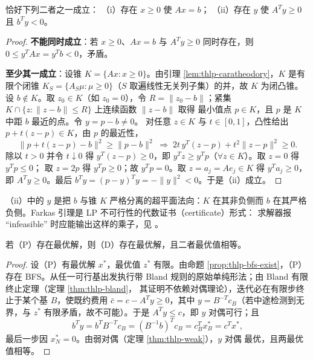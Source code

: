 \begin{lemma}[Farkas]\label{lem:thlp-farkas}
恰好下列二者之一成立：
（i）存在 $x\ge0$ 使 $Ax=b$；
（ii）存在 $y$ 使 $A^{T}y\ge0$ 且 $b^{T}y<0$。
\end{lemma}

\begin{proof}
\textbf{不能同时成立}：若 $x\ge0$、$Ax=b$ 与 $A^{T}y\ge0$ 同时存在，则
$0\le y^{T}Ax=y^{T}b<0$，矛盾。

\textbf{至少其一成立}：设锥 $K=\{Ax:x\ge0\}$。由引理
\ref{lem:thlp-caratheodory}，$K$ 是有限个闭锥
$K_S=\{A_S\mu:\mu\ge0\}$（$S$ 取遍线性无关列子集）的并，故 $K$ 为闭凸锥。
设 $b\notin K$。取 $z_0\in K$（如 $z_0=0$），令
$R=\|z_0-b\|$；紧集 $K\cap\{z:\|z-b\|\le R\}$ 上连续函数 $\|z-b\|$ 取得
最小值点 $p\in K$，且 $p$ 是 $K$ 中距 $b$ 最近的点。令 $y=p-b\ne0$。
对任意 $z\in K$ 与 $t\in[0,1]$，凸性给出 $p+t(z-p)\in K$，由 $p$ 的最近性，
\begin{equation*}
  \|p+t(z-p)-b\|^{2}\ge\|p-b\|^{2}
  \;\Longrightarrow\;
  2t\,y^{T}(z-p)+t^{2}\|z-p\|^{2}\ge0 .
\end{equation*}
除以 $t>0$ 并令 $t\downarrow0$ 得 $y^{T}(z-p)\ge0$，即
$y^{T}z\ge y^{T}p$（$\forall z\in K$）。取 $z=0$ 得 $y^{T}p\le0$；
取 $z=2p$ 得 $y^{T}p\ge0$；故 $y^{T}p=0$。取 $z=a_j=Ae_j\in K$ 得
$y^{T}a_j\ge0$，即 $A^{T}y\ge0$。最后
$b^{T}y=(p-y)^{T}y=-\|y\|^{2}<0$。于是（ii）成立。
\end{proof}

\begin{remark}\label{rem:thlp-farkas-geo}
（ii）中的 $y$ 是把 $b$ 与锥 $K$ 严格分离的超平面法向：$K$ 在其非负侧而
$b$ 在其严格负侧。Farkas 引理是 LP 不可行性的代数证书（certificate）形式：
求解器报 ``infeasible'' 时应能输出这样的乘子，见
。
\end{remark}

\begin{theorem}[强对偶]\label{thm:thlp-strong}
若（P）存在最优解，则（D）存在最优解，且二者最优值相等。
\end{theorem}

\begin{proof}
设（P）有最优解 $x^{*}$，最优值 $z^{*}$ 有限。由命题
\ref{prop:thlp-bfs-exist}，（P）存在 BFS。从任一可行基出发执行带 Bland
规则的原始单纯形法；由 Bland 有限终止定理（定理 \ref{thm:thlp-bland}，
其证明不依赖对偶理论），迭代必在有限步终止于某个基 $B$，使既约费用
$\bar c=c-A^{T}y\ge0$，其中 $y=B^{-T}c_B$（若中途检测到无界，与
$z^{*}$ 有限矛盾，故不可能）。于是 $A^{T}y\le c$，即 $y$ 对偶可行；且
\begin{equation*}
  b^{T}y=b^{T}B^{-T}c_B=(B^{-1}b)^{T}c_B=c_B^{T}x_B^{*}=c^{T}x^{*},
\end{equation*}
最后一步因 $x^{*}_N=0$。由弱对偶（定理 \ref{thm:thlp-weak}），$y$ 对偶
最优，且两最优值相等。
\end{proof}

